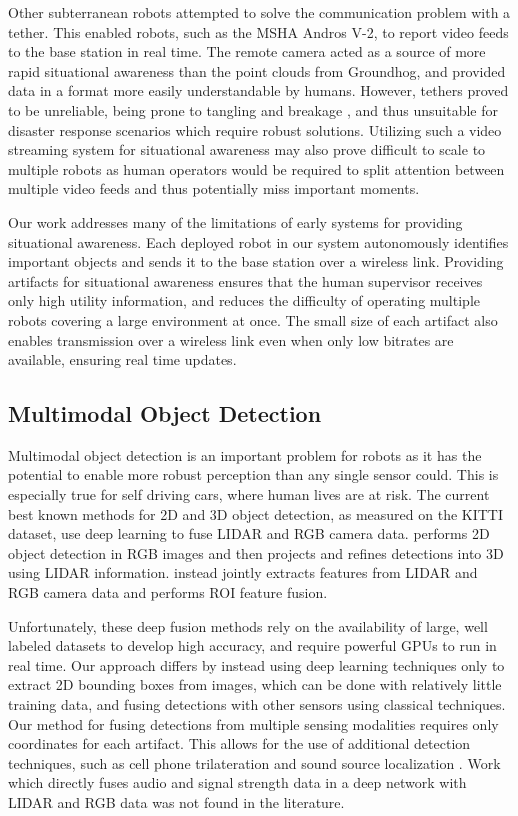 Other subterranean robots attempted to solve the communication problem with a tether. This enabled robots, such as the MSHA Andros V-2, to report video feeds to the base station in real time. The remote camera acted as a source of more rapid situational awareness than the point clouds from Groundhog, and provided data in a format more easily understandable by humans. However, tethers proved to be unreliable, being prone to tangling and breakage \cite{murphy2009mobile}, and thus unsuitable for disaster response scenarios which require robust solutions. Utilizing such a video streaming system for situational awareness may also prove difficult to scale to multiple robots as human operators would be required to split attention between multiple video feeds and thus potentially miss important moments.

Our work addresses many of the limitations of early systems for providing situational awareness. Each deployed robot in our system autonomously identifies important objects and sends it to the base station over a wireless link. Providing artifacts for situational awareness ensures that the human supervisor receives only high utility information, and reduces the difficulty of operating multiple robots covering a large environment at once. The small size of each artifact also enables transmission over a wireless link even when only low bitrates are available, ensuring real time updates.

\subsection{Multimodal Object Detection}

Multimodal object detection is an important problem for robots as it has the potential to enable more robust perception than any single sensor could. This is especially true for self driving cars, where human lives are at risk. The current best known methods for 2D and 3D object detection, as measured on the KITTI dataset, use deep learning to fuse LIDAR and RGB camera data. \cite{qi2018frustum} performs 2D object detection in RGB images and then projects and refines detections into 3D using LIDAR information. \cite{liang2019multi} instead jointly extracts features from LIDAR and RGB camera data and performs ROI feature fusion.

Unfortunately, these deep fusion methods rely on the availability of large, well labeled datasets to develop high accuracy, and require powerful GPUs to run in real time. Our approach differs by instead using deep learning techniques only to extract 2D bounding boxes from images, which can be done with relatively little training data, and fusing detections with other sensors using classical techniques. Our method for fusing detections from multiple sensing modalities requires only coordinates for each artifact. This allows for the use of additional detection techniques, such as cell phone trilateration \cite{iglesias2012indoor} and sound source localization \cite{grondin2019lightweight}. Work which directly fuses audio and signal strength data in a deep network with LIDAR and RGB data was not found in the literature.